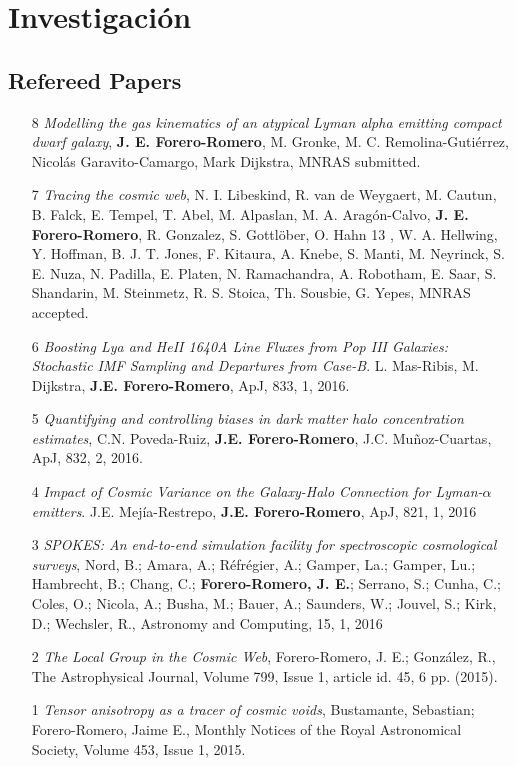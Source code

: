 \documentclass{article}
\begin{document}
\section{Investigaci\'on}

\subsection{Refereed Papers}

\begin{itemize}

\item[8]{\it Modelling the gas kinematics of an atypical Lyman alpha
emitting compact dwarf galaxy}, {\bf J. E. Forero-Romero}, M. Gronke, M. C. Remolina-Guti\'errez,
Nicol\'as Garavito-Camargo, Mark Dijkstra, MNRAS submitted. 

\item[7]{\it Tracing the cosmic web}, N. I. Libeskind, R. van de Weygaert, M. Cautun, B. Falck, E.
Tempel, T. Abel, M. Alpaslan, M. A. Aragón-Calvo, {\bf
  J. E. Forero-Romero},  R. Gonzalez, S. Gottl\"ober, O. Hahn 13 ,
W. A. Hellwing, Y. Hoffman, B. J. T. Jones, F. Kitaura, A. Knebe,
S. Manti, M. Neyrinck, S. E. Nuza, N. Padilla, E. Platen,
N. Ramachandra, A. Robotham, E. Saar, S. Shandarin, M. Steinmetz,
R. S. Stoica, Th. Sousbie, G. Yepes, MNRAS accepted.  

\item[6]{\it Boosting Lya and HeII 1640A Line Fluxes from Pop III
  Galaxies: Stochastic IMF Sampling and Departures from
  Case-B}. L. Mas-Ribis, M. Dijkstra, {\bf J.E. Forero-Romero},
  ApJ, 833, 1, 2016.

\item[5]{\it Quantifying and controlling biases in dark matter halo
  concentration estimates}, C.N. Poveda-Ruiz, {\bf
  J.E. Forero-Romero}, J.C. Mu\~noz-Cuartas, ApJ, 832, 2, 2016. 

\item[4]{\it Impact of Cosmic Variance on the Galaxy-Halo Connection
  for Lyman-$\alpha$ emitters}.  J.E. Mej\'ia-Restrepo, {\bf
  J.E. Forero-Romero}, ApJ, 821, 1, 2016

\item[3]{\it SPOKES: An end-to-end simulation facility for
  spectroscopic cosmological surveys}, 
	Nord, B.; Amara, A.; R\'efr\'egier, A.; Gamper, La.; Gamper, Lu.;
        Hambrecht, B.; Chang, C.; {\bf Forero-Romero, J. E.}; Serrano, S.;
        Cunha, C.; Coles, O.; Nicola, A.; Busha, M.; Bauer, A.;
        Saunders, W.; Jouvel, S.; Kirk, D.; Wechsler, R., Astronomy
        and Computing, 15, 1, 2016
\item[2]{\it The Local Group in the Cosmic Web}, 	
Forero-Romero, J. E.; González, R., The Astrophysical Journal, Volume
799, Issue 1, article id. 45, 6 pp. (2015). 
\item[1] {\it Tensor anisotropy as a tracer of cosmic voids}, 
Bustamante, Sebastian; Forero-Romero, Jaime E., Monthly Notices of the
Royal Astronomical Society, Volume 453, Issue 1, 2015.
\end{itemize}
\end{document}
